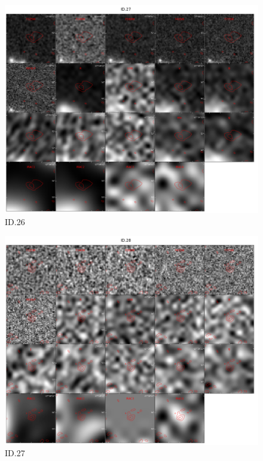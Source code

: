 \begin{figure}[tbp]
\centering \includegraphics[width=120mm]{Matched/ASPECS_Cutout_26.jpg}
\caption{ID.26}
\label{fig:Match_Three}
\end{figure}

\begin{figure}[tbp]
\centering \includegraphics[width=120mm]{Matched/ASPECS_Cutout_27.jpg}
\caption{ID.27}
\label{fig:Match_Three}
\end{figure}

